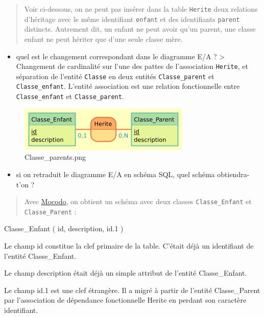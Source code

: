 \documentclass[11pt]{article}
\makeatletter
\def\maxwidth{\ifdim\Gin@nat@width>\linewidth\linewidth
    \else\Gin@nat@width\fi}
\let\Oldincludegraphics\includegraphics
\renewcommand{\includegraphics}[1]{\Oldincludegraphics[width=.8\maxwidth]{#1}}
\providecommand{\tightlist}{%
      \setlength{\itemsep}{0pt}\setlength{\parskip}{0pt}}
\makeatother
\begin{document}
\begin{quote}
Voir ci-dessous, on ne peut pas insérer dans la table \texttt{Herite}
deux relations d'héritage avec le même identifiant \texttt{enfant} et
des identifiants \texttt{parent} distincts. Autrement dit, un enfant ne
peut avoir qu'un parent, une classe enfant ne peut hériter que d'une
seule classe mère.
\end{quote}

\begin{itemize}
\tightlist
\item
  quel est le changement correspondant dans le diagramme E/A ?
  \textgreater{} Changement de cardinalité sur l'une des pattes de
  l'association \texttt{Herite}, et séparation de l'entité
  \texttt{Classe} en deux entités \texttt{Classe\_parent} et
  \texttt{Classe\_enfant}. L'entité association est une relation
  fonctionnelle entre \texttt{Classe\_enfant} et
  \texttt{Classe\_parent}.
\end{itemize}

\begin{figure}
\centering
\includegraphics{mocodo/Classe_parents/Classe_parents.png}
\caption{Classe\_parents.png}
\end{figure}

\begin{itemize}
\tightlist
\item
  si on retraduit le diagramme E/A en schéma SQL, quel schéma
  obtiendra-t'on ?
\end{itemize}

\begin{quote}
Avec \href{http://mocodo.wingi.net/}{Mocodo}, on obtient un schéma avec
deux classes \texttt{Classe\_Enfant} et \texttt{Classe\_Parent} :
\end{quote}

{Classe\_Enfant} ( {id}, {description}, {id.1} )

Le champ id constitue la clef primaire de la table. C'était déjà un
identifiant de l'entité Classe\_Enfant.

Le champ description était déjà un simple attribut de l'entité
Classe\_Enfant.

Le champ id.1 est une clef étrangère. Il a migré à partir de l'entité
Classe\_Parent par l'association de dépendance fonctionnelle Herite en
perdant son caractère identifiant.
\end{document}
